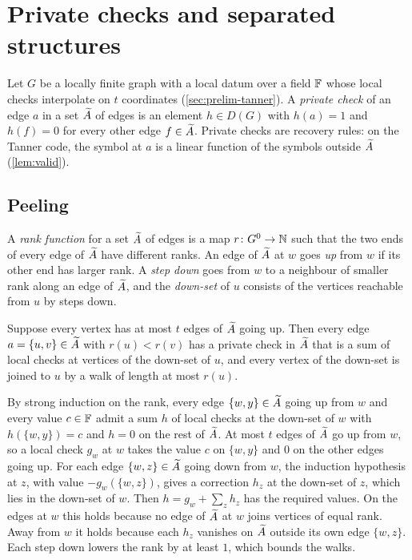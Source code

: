 \section{Private checks and separated structures}\label{sec:peeling}

Let $G$ be a locally finite graph with a local datum over a field $\mathbb{F}$ whose local checks interpolate on $t$
coordinates (\cref{sec:prelim-tanner}). A \emph{private check} of an edge $a$ in a set $\widetilde A$ of edges is an element
$h\in D(G)$ with $h(a)=1$ and $h(f)=0$ for every other edge $f\in\widetilde A$. Private checks are recovery rules: on the
Tanner code, the symbol at $a$ is a linear function of the symbols outside $\widetilde A$ (\cref{lem:valid}).

\subsection{Peeling}\label{sec:peeling-lemma}

A \emph{rank function} for a set $\widetilde A$ of edges is a map $r\colon G^0\to\mathbb{N}$ such that the two ends of every edge
of $\widetilde A$ have different ranks. An edge of $\widetilde A$ at $w$ goes \emph{up} from $w$ if its other end has larger rank.
A \emph{step down} goes from $w$ to a neighbour of smaller rank along an edge of $\widetilde A$, and the \emph{down-set} of
$u$ consists of the vertices reachable from $u$ by steps down.

\begin{lemma}[Peeling]\label{lem:peeling}
Suppose every vertex has at most $t$ edges of $\widetilde A$ going up. Then every edge $a=\{u,v\}\in\widetilde A$ with $r(u)<r(v)$ has a
private check in $\widetilde A$ that is a sum of local checks at vertices of the down-set of $u$, and every vertex of the
down-set is joined to $u$ by a walk of length at most $r(u)$.
\end{lemma}
\begin{outline}
By strong induction on the rank, every edge $\{w,y\}\in\widetilde A$ going up from $w$ and every value $c\in\mathbb{F}$ admit a sum
$h$ of local checks at the down-set of $w$ with $h(\{w,y\})=c$ and $h=0$ on the rest of $\widetilde A$. At most $t$ edges of
$\widetilde A$ go up from $w$, so a local check $g_w$ at $w$ takes the value $c$ on $\{w,y\}$ and $0$ on the other edges going
up. For each edge $\{w,z\}\in\widetilde A$ going down from $w$, the induction hypothesis at $z$, with value $-g_w(\{w,z\})$,
gives a correction $h_z$ at the down-set of $z$, which lies in the down-set of $w$. Then
$h=g_w+\sum_zh_z$ has the required values. On the edges at $w$ this holds because no edge of $\widetilde A$ at $w$ joins
vertices of equal rank. Away from $w$ it holds because each $h_z$ vanishes on $\widetilde A$ outside its own edge
$\{w,z\}$. Each step down lowers the rank by at least $1$, which bounds the walks.
\end{outline}

